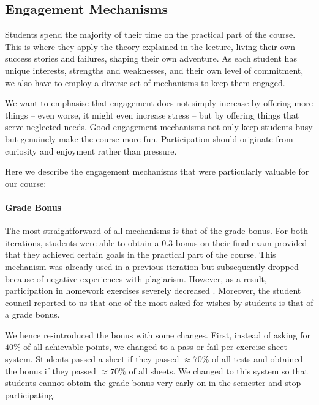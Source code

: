 \subsection{Engagement Mechanisms}\label{sec:engagement}


Students spend the majority of their time on the practical part of the course.
This is where they apply the theory explained in the lecture,
living their own success stories and failures,
shaping their own adventure.
As each student has unique interests, strengths and weaknesses, and their own level of commitment,
we also have to employ a diverse set of mechanisms to keep them engaged.

We want to emphasise that engagement does not simply
increase by offering more things -- even worse, it might even increase stress --
but by offering things that serve neglected needs.
Good engagement mechanisms not only keep students busy
but genuinely make the course more fun.
Participation should originate from curiosity and enjoyment rather than pressure.

Here we describe the engagement mechanisms that were particularly valuable for our course:

\paragraph{Grade Bonus}
The most straightforward of all mechanisms is
that of the grade bonus.
For both iterations,
students were able to obtain a  0.3 bonus on their final exam provided that they achieved certain goals in the practical part of the course.
This mechanism was already used in a previous iteration
but subsequently dropped because of negative experiences with plagiarism.
However, as a result, participation in homework exercises
severely decreased \cite{next_1100}.
Moreover, the student council reported to us that one of the most asked for
wishes by students is that of a grade bonus.

We hence re-introduced the bonus with some changes.
First, instead of asking for $40\%$ of all achievable points,
we changed to a pass-or-fail per exercise sheet system.
Students passed a sheet if they
passed $\approx 70\%$ of all tests
and obtained the bonus if they passed $\approx 70\%$ of all sheets.
We changed to this system so that students
cannot obtain the grade bonus very early on in the semester and stop participating.

